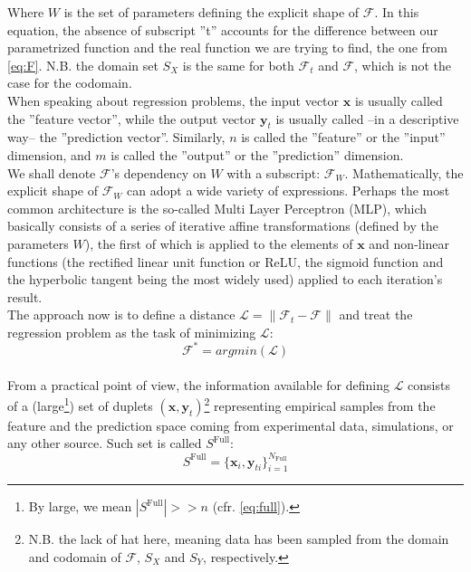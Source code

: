 Where $W$ is the set of parameters defining the explicit shape of $\mathcal{{F}}$. In this equation, the absence of subscript ''t'' accounts for the difference between our parametrized function and the real function we are trying to find, the one from \cref{eq:F}. N.B. the domain set $S_X$ is the same for both $\mathcal{F}_t$ and $\mathcal{F}$, which is not the case for the codomain.\\
%
\indent When speaking about regression problems, the input vector $\mathbf{x}$ is usually called the ''feature vector'', while the output vector $\mathbf{y}_t$ is usually called --in a descriptive way-- the ''prediction vector''. Similarly, $n$ is called the ''feature'' or the ''input'' dimension, and $m$ is called the ''output'' or the ''prediction'' dimension.\\
%
\indent We shall denote $\mathcal{{F}}$'s dependency on $W$ with a subscript: $\mathcal{{F}}_W$. Mathematically, the explicit shape of $\mathcal{{F}}_W$ can adopt a wide variety of expressions. Perhaps the most common architecture is the so-called Multi Layer Perceptron (MLP)\cite{Marsland2015Machine}, which basically consists of a series of iterative affine transformations (defined by the parameters $W$), the first of which is applied to the elements of $\mathbf{x}$ and non-linear functions (the rectified linear unit function or ReLU, the sigmoid function and the hyperbolic tangent being the most widely used) applied to each iteration's result.\\
%
\indent The approach now is to define a distance $\mathcal{L}=\|\mathcal{F}_t-\mathcal{{F}}\|$ and treat the regression problem as the task of minimizing $\mathcal{L}$:
\begin{equation}\label{eq:Fargmin}
	\mathcal{{F}}^*=argmin(\mathcal{L})
\end{equation}\\
%
\indent From a practical point of view, the information available for defining $\mathcal{L}$ consists of a (large\footnote{By large, we mean $\left|S^\text{Full}\right|>>n$ (cfr. \cref{eq:full}).}) set of duplets $(\mathbf{x},\mathbf{y}_t)$\footnote{N.B. the lack of hat here, meaning data has been sampled from the domain and codomain of $\mathcal{F}$, $S_X$ and $S_Y$, respectively.} representing empirical samples from the feature and the prediction space coming from experimental data, simulations, or any other source. Such set is called $S^\text{Full}$:
\begin{equation}\label{eq:full}
	S^\text{Full}=\{\mathbf{x}_i,\mathbf{y}_{ti}\}_{i=1}^{N_{\text{Full}}}
\end{equation}
